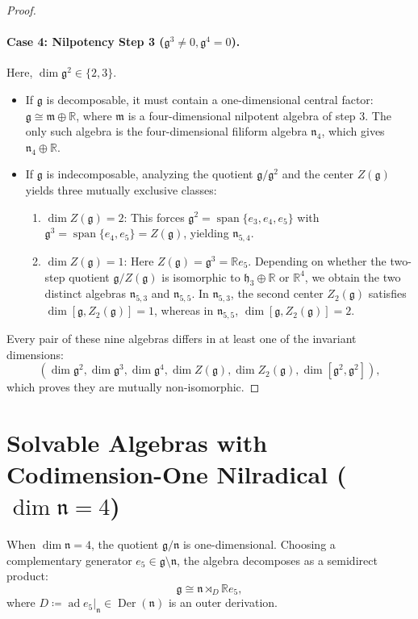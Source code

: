 \documentclass[11pt,a4paper]{article}
\theoremstyle{definition}
\theoremstyle{remark}
\newcommand{\R}{\mathbb{R}}
\newcommand{\g}{\mathfrak{g}}
\newcommand{\n}{\mathfrak{n}}
\newcommand{\hh}{\mathfrak{h}}
\newcommand{\ad}{\operatorname{ad}}
\newcommand{\Der}{\operatorname{Der}}
\newcommand{\spanop}{\operatorname{span}}
\begin{document}
\begin{proof}
\paragraph{Case 4: Nilpotency Step 3 ($\g^3 \neq 0, \g^4 = 0$).}
Here, $\dim \g^2 \in \{2, 3\}$.
\begin{itemize}
    \item If $\g$ is decomposable, it must contain a one-dimensional central factor: $\g \cong \mathfrak{m} \oplus \R$, where $\mathfrak{m}$ is a four-dimensional nilpotent algebra of step 3. The only such algebra is the four-dimensional filiform algebra $\mathfrak{n}_4$, which gives $\mathfrak{n}_4 \oplus \R$.
    \item If $\g$ is indecomposable, analyzing the quotient $\g/\g^2$ and the center $Z(\g)$ yields three mutually exclusive classes:
    \begin{enumerate}
        \item $\dim Z(\g) = 2$: This forces $\g^2 = \spanop\{e_3, e_4, e_5\}$ with $\g^3 = \spanop\{e_4, e_5\} = Z(\g)$, yielding $\mathfrak{n}_{5,4}$.
        \item $\dim Z(\g) = 1$: Here $Z(\g) = \g^3 = \R e_5$. Depending on whether the two-step quotient $\g/Z(\g)$ is isomorphic to $\hh_3 \oplus \R$ or $\R^4$, we obtain the two distinct algebras $\mathfrak{n}_{5,3}$ and $\mathfrak{n}_{5,5}$. In $\mathfrak{n}_{5,3}$, the second center $Z_2(\g)$ satisfies $\dim [\g, Z_2(\g)] = 1$, whereas in $\mathfrak{n}_{5,5}$, $\dim [\g, Z_2(\g)] = 2$.
    \end{enumerate}
\end{itemize}
Every pair of these nine algebras differs in at least one of the invariant dimensions:
\begin{equation}
    (\dim \g^2, \dim \g^3, \dim \g^4, \dim Z(\g), \dim Z_2(\g), \dim [\g^2, \g^2]),
\end{equation}
which proves they are mutually non-isomorphic.
\end{proof}

\section{Solvable Algebras with Codimension-One Nilradical ($\dim \n = 4$)}\label{sec:nilp4}

When $\dim \n = 4$, the quotient $\g/\n$ is one-dimensional. Choosing a complementary generator $e_5 \in \g \setminus \n$, the algebra decomposes as a semidirect product:
\begin{equation}
    \g \cong \n \rtimes_D \R e_5,
\end{equation}
where $D \coloneqq \ad e_5|_\n \in \Der(\n)$ is an outer derivation.
\end{document}
